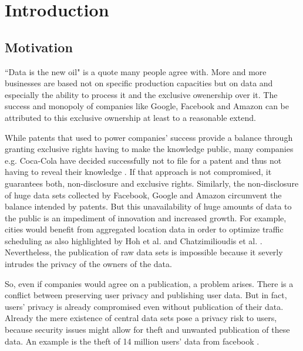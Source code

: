 
\chapter{Introduction}\label{chapter:introduction}
\section{Motivation}

“Data is the new oil" \parencite{data-is-the-new-oil, data-is-the-new-oil2} is a quote many people agree with. More and more businesses are based not on specific production capacities but on data and especially the ability to process it and the exclusive owenership over it. The success and monopoly of companies like Google, Facebook and Amazon can be attributed to this exclusive ownership at least to a reasonable extend.

While patents that used to power companies' success provide a balance through granting exclusive rights having to make the knowledge public, many companies e.g. Coca-Cola have decided successfully not to file for a patent and thus not having to reveal their knowledge \parencite{coca-cola}. If that approach is not compromised, it guarantees both, non-disclosure and  exclusive rights. Similarly, the non-disclosure of huge data sets collected by Facebook, Google and Amazon circumvent the balance intended by patents. But this unavailability of huge amounts of data to the public is an impediment of innovation and increased growth. For example, cities would benefit from aggregated location data in order to optimize traffic scheduling as also highlighted by Hoh et al. \parencite{hoh2005protecting} and Chatzimilioudis et al. \parencite{chatzimilioudis2012crowdsourcing}.
Nevertheless, the publication of raw data sets is impossible because it severly intrudes the privacy of the owners of the data.

So, even if companies would agree on a publication, a problem arises.
There is a conflict between preserving user privacy and publishing user data.
But in fact, users' privacy is already compromised even without publication of their data. Already the mere existence of central data sets pose a privacy risk to users, because security issues might allow for theft and unwanted publication of these data.
An example is the theft of 14 million users' data from facebook \parencite{facebook}.

